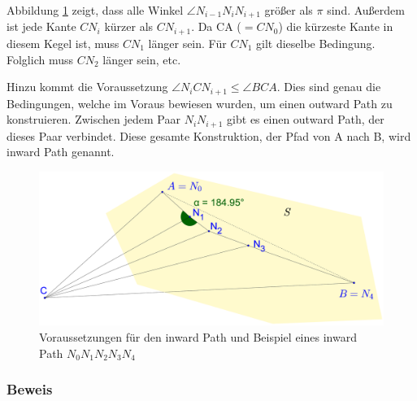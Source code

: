 \documentclass[a4paper,twoside]{IEEEtran}
\begin{document}
Abbildung \ref{fig:inward_path_prop} zeigt, dass alle Winkel $\angle{N_{i-1}N_iN_{i+1}} $ größer als $\pi $ sind.
Außerdem ist jede Kante $CN_i $ kürzer als $CN_{i+1}$. 
Da CA ($= CN_0 $) die kürzeste Kante in diesem Kegel ist, muss $CN_1 $ länger sein. 
Für $CN_1 $ gilt dieselbe Bedingung. 
Folglich muss $CN_2 $ länger sein, etc.

Hinzu kommt die Voraussetzung $\angle{N_iCN_{i+1}} \leq \angle{BCA} $.
Dies sind genau die Bedingungen, welche im Voraus bewiesen wurden, um einen outward Path zu konstruieren. 
Zwischen jedem Paar $N_iN_{i+1} $ gibt es einen outward Path, der dieses Paar verbindet.
Diese gesamte Konstruktion, der Pfad von A nach B, wird inward Path genannt.

\begin{figure}[h!]
\centering
\includegraphics[width=1\linewidth]{inward_path_prop.eps}
\caption{Voraussetzungen für den inward Path und Beispiel eines inward Path $N_0N_1N_2N_3N_4 $}
\label{fig:inward_path_prop}
\end{figure}


\subsubsection{Beweis}









\end{document}
